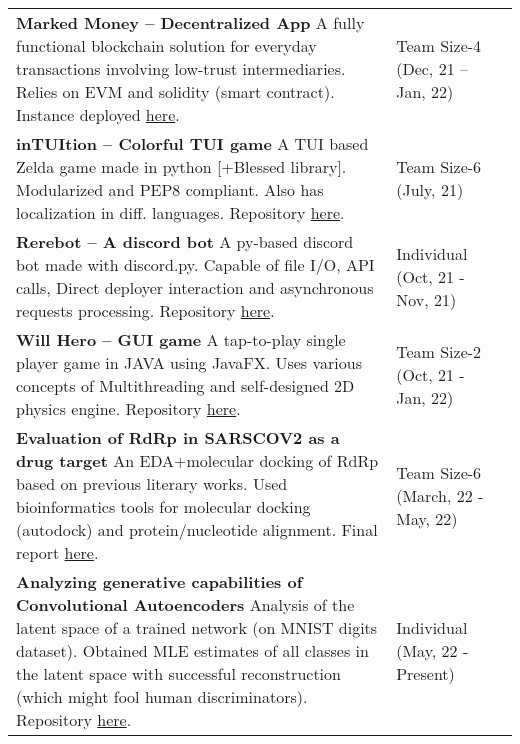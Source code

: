\documentclass[10pt]{extarticle}
\begin{document}
\begin{longtable}{p{}p{}p{}}
    \textbf{Marked Money – Decentralized App}\newline
    A fully functional blockchain solution for everyday transactions
    involving low-trust intermediaries. Relies on EVM and solidity (smart contract).
    Instance deployed \href{https://macaroon.web.app/}{here}.
    &Team Size-4
    \newline (Dec, 21 – Jan, 22)\\
    \textbf{inTUItion – Colorful TUI game}\newline
    A TUI based Zelda game made in python [+Blessed library]. Modularized and PEP8 compliant. Also has localization in diff. languages. Repository \href{https://github.com/StephD/CJ8-blessed-badgers}{here}.
    &Team Size-6
    \newline (July, 21)\\
    \textbf{Rerebot – A discord bot}\newline
    A py-based discord bot made with discord.py. Capable of file I/O, API calls, Direct deployer interaction and asynchronous requests processing. Repository \href{https://github.com/Anindya-Prithvi/rerebot}{here}.
    &Individual
    \newline (Oct, 21 - Nov, 21)\\
    \textbf{Will Hero – GUI game}\newline
    A tap-to-play single player game in JAVA using JavaFX. Uses various
    concepts of Multithreading and self-designed 2D physics engine. Repository \href{https://github.com/vibsterD/CSE201-AP-Project}{here}.
    &Team Size-2
    \newline (Oct, 21 - Jan, 22)\\
    \textbf{Evaluation of RdRp in SARSCOV2 as a drug target}\newline
    An EDA+molecular docking of RdRp based on previous literary works. Used
    bioinformatics tools for molecular docking (autodock) and protein/nucleotide
    alignment. Final report \href{https://anindya-prithvi.github.io/filehost/PB_Project.pdf}{here}.
    &Team Size-6
    \newline (March, 22 - May, 22)\\
    \textbf{Analyzing generative capabilities of Convolutional Autoencoders}\newline
    Analysis of the latent space of a trained network (on MNIST digits dataset). Obtained MLE estimates of all classes in the latent space with successful reconstruction (which might fool human discriminators). Repository \href{https://github.com/Anindya-Prithvi/MNIST_CAELatentSpace}{here}.
    &Individual
    \newline (May, 22 - Present)\\
\end{longtable}
\end{document}
